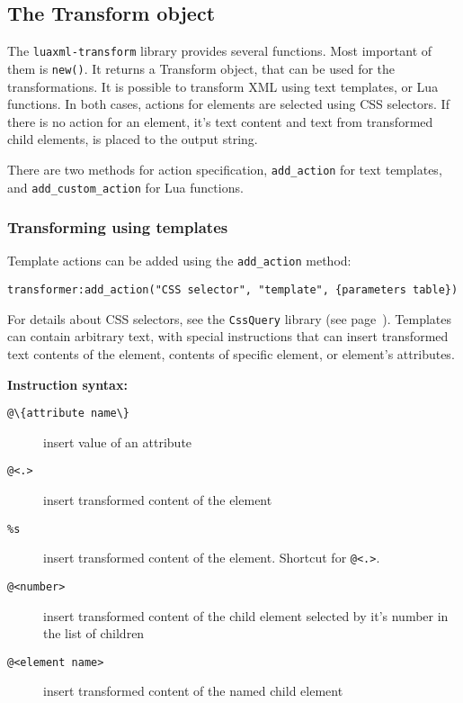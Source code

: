\documentclass{ltxdoc}
\begin{document}
\subsection{The Transform object }

The \texttt{luaxml-transform} library provides several functions. 
Most important of them is \verb|new()|. It returns a Transform object,
that can be used for the transformations. It is possible to transform 
XML using text templates, or Lua functions. In both cases, actions for
elements are selected using CSS selectors. If there is no action for 
an element, it's text content and text from transformed child elements,
is placed to the output string.

There are two methods for action specification, \verb|add_action| for 
text templates, and \verb|add_custom_action| for Lua functions.

\subsubsection{Transforming using templates}\label{sec:transform-templates}

Template actions can be added using the \verb|add_action| method:

\begin{verbatim}
transformer:add_action("CSS selector", "template", {parameters table})
\end{verbatim}

For details about CSS selectors, see the \texttt{CssQuery} library 
(see page~\pageref{sec:cssquery_library}). Templates can contain 
arbitrary text, with special instructions that can insert transformed
text contents of the element, contents of specific element, or element's
attributes.


\noindent\textbf{Instruction syntax:}

\begin{description}
  \item[\verb|@\{attribute name\}|] insert value of an attribute
  \item[\verb|@<.>|] insert transformed content of the element
  \item[\texttt{\%s}] insert transformed content of the element. Shortcut for \verb|@<.>|.
  \item[\verb|@<number>|] insert transformed content of the child element
    selected by it's number in the list of children
  \item[\verb|@<element name>|] insert transformed content of the named child element
\end{description}
\end{document}

